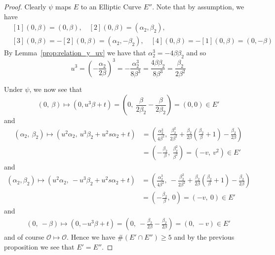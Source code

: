 \documentclass{scrartcl}
\renewcommand{\O}{\mathcal{O}}
\theoremstyle{definition}
\begin{document}
\begin{proof}
    Clearly $\psi$ maps $E$ to an Elliptic Curve $E''$.
    Note that by assumption, we have
    \begin{align*}
        &[1](0, \beta) = (0, \beta), \quad [2](0, \beta) = (\alpha_2, \beta_2), \\
        &[3](0, \beta) = -[2](0, \beta) = (\alpha_2, -\beta_2), \quad [4](0, \beta) = -[1](0, \beta) = (0, -\beta)
    \end{align*}
    By Lemma~\ref{prop:relation_y_uv} we have that $\alpha_2^3 = -4\beta\beta_2$ and so
    \begin{equation*}
        u^3 = \left( -\frac {\alpha_2} {2\beta} \right)^3 = -\frac {\alpha_2^3} {8\beta^3} = \frac {4\beta\beta_2} {8\beta^3} = \frac {\beta_2} {2\beta^2}
    \end{equation*}

    Under $\psi$, we now see that
    \begin{equation*}
        (0, \ \beta) \mapsto (0, u^3 \beta + t) = \left( 0, \ \frac {\beta} {2\beta_2} - \frac {\beta} {2\beta_2} \right) = (0, 0) \in E'
    \end{equation*}
    and
    \begin{align*}
        (\alpha_2, \ \beta_2) \mapsto (u^2 \alpha_2, \ u^3 \beta_2 + u^2 s \alpha_2 + t) &= \left(\frac {\alpha_2^3} {4\beta^2}, \ \frac {\beta_2^2} {2\beta^2} + \frac {\beta_2} {2\beta} \left( \frac {\beta_2} {\beta} + 1 \right) - \frac {\beta_2} {2\beta} \right) \\
        &= \left( -\frac {\beta_2} {\beta}, \ \frac {\beta_2^2} {\beta^2} \right) = (-v, \ v^2) \in E'
    \end{align*}
    and
    \begin{align*}
        (\alpha_2, \beta_2) \mapsto (u^2 \alpha_2, \ -u^3 \beta_2 + u^2 s \alpha_2 + t) &= \left(\frac {\alpha_2^3} {4\beta^2}, \ -\frac {\beta_2^2} {2\beta^2} + \frac {\beta_2} {2\beta} \left( \frac {\beta_2} {\beta} + 1 \right) - \frac {\beta_2} {2\beta} \right) \\
        &= ( -\frac {\beta_2} {\beta}, \ 0) = (-v, \ 0) \in E'
    \end{align*}
    and
    \begin{align*}
        (0, \ -\beta) \mapsto (0, -u^3 \beta + t) = \left( 0, \ -\frac {\beta_2} {2\beta} - \frac {\beta_2} {2\beta} \right) = (0, \ -v) \in E'
    \end{align*}
    and of course $\O \mapsto \O$.
    Hence we have $\#(E' \cap E'') \geq 5$ and by the previous proposition we see that $E' = E''$.
\end{proof}
\end{document}
